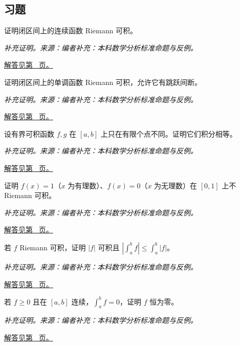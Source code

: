 \documentclass[12pt,fontset=fandol]{ctexart}
\begin{document}
\subsection{习题}
\begin{example}[连续函数的黎曼可积性]\label{ex:c30q1}
证明闭区间上的连续函数 Riemann 可积。
\par\textit{补充证明。来源：编者补充：本科数学分析标准命题与反例。}\par\hyperref[ans:c30q1]{解答见第~\pageref{ans:c30q1} 页。}
\end{example}
\begin{example}[单调函数的可积性]\label{ex:c30q2}
证明闭区间上的单调函数 Riemann 可积，允许它有跳跃间断。
\par\textit{补充证明。来源：编者补充：本科数学分析标准命题与反例。}\par\hyperref[ans:c30q2]{解答见第~\pageref{ans:c30q2} 页。}
\end{example}
\begin{example}[有限个点的修改不改变积分]\label{ex:c30q3}
设有界可积函数 $f,g$ 在 $[a,b]$ 上只在有限个点不同。证明它们积分相等。
\par\textit{补充证明。来源：编者补充：本科数学分析标准命题与反例。}\par\hyperref[ans:c30q3]{解答见第~\pageref{ans:c30q3} 页。}
\end{example}
\begin{example}\label{ex:c30q4}
证明 $f(x)=1$（$x$ 为有理数）、$f(x)=0$（$x$ 为无理数）在 $[0,1]$ 上不 Riemann 可积。
\par\textit{补充证明。来源：编者补充：本科数学分析标准命题与反例。}\par\hyperref[ans:c30q4]{解答见第~\pageref{ans:c30q4} 页。}
\end{example}
\begin{example}[积分绝对值不等式]\label{ex:c30q5}
若 $f$ Riemann 可积，证明 $|f|$ 可积且 $|\int_a^bf|\le\int_a^b|f|$。
\par\textit{补充证明。来源：编者补充：本科数学分析标准命题与反例。}\par\hyperref[ans:c30q5]{解答见第~\pageref{ans:c30q5} 页。}
\end{example}
\begin{example}[非负连续函数积分为零]\label{ex:c30q6}
若 $f\ge0$ 且在 $[a,b]$ 连续，$\int_a^bf=0$，证明 $f$ 恒为零。
\par\textit{补充证明。来源：编者补充：本科数学分析标准命题与反例。}\par\hyperref[ans:c30q6]{解答见第~\pageref{ans:c30q6} 页。}
\end{example}
\end{document}
